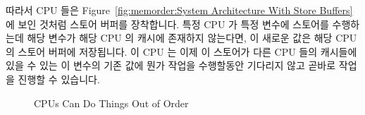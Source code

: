따라서 CPU 들은
Figure~\ref{fig:memorder:System Architecture With Store Buffers} 에 보인 것처럼
스토어 버퍼를 장착합니다.
특정 CPU 가 특정 변수에 스토어를 수행하는데 해당 변수가 해당 CPU 의 캐시에
존재하지 않는다면, 이 새로운 값은 해당 CPU 의 스토어 버퍼에 저장됩니다.
이 CPU 는 이제 이 스토어가 다른 CPU 들의 캐시들에 있을 수 있는 이 변수의 기존
값에 뭔가 작업을 수행할동안 기다리지 않고 곧바로 작업을 진행할 수 있습니다.

\begin{figure}[tb]
\centering
{}
\caption{CPUs Can Do Things Out of Order}
\end{figure}

